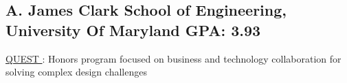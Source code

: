 \documentclass[]{jack-resume}
\begin{document}
\subsection{A. James Clark School of Engineering, University Of Maryland \hfill GPA: 3.93}
 \hfill
\begin{tightemize}
    \item \color{darkmodePrimary}\href{https://www.rhsmith.umd.edu/programs/undergraduate-programs/academics/fellows-special-programs/quest}{QUEST \ExternalLink}: Honors program focused on business and technology collaboration for solving complex design challenges
\end{tightemize}



\end{document}
